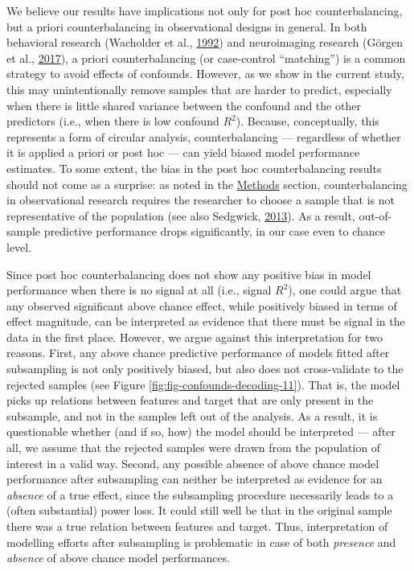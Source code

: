 \documentclass[11pt,american,a4paper,oneside,]{memoir} %
\begin{document}
We believe our results have implications not only for post hoc counterbalancing, but a priori counterbalancing in observational designs in general. In both behavioral research (Wacholder et al., \protect\hyperlink{ref-Wacholder1992-wb}{1992}) and neuroimaging research (Görgen et al., \protect\hyperlink{ref-Gorgen2017-sy}{2017}), a priori counterbalancing (or case-control ``matching'') is a common strategy to avoid effects of confounds. However, as we show in the current study, this may unintentionally remove samples that are harder to predict, especially when there is little shared variance between the confound and the other predictors (i.e., when there is low confound \(R^2\)). Because, conceptually, this represents a form of circular analysis, counterbalancing --- regardless of whether it is applied a priori or post hoc --- can yield biased model performance estimates. To some extent, the bias in the post hoc counterbalancing results should not come as a surprise: as noted in the \protect\hyperlink{confounds-decoding-methods}{Methods} section, counterbalancing in observational research requires the researcher to choose a sample that is not representative of the population (see also Sedgwick, \protect\hyperlink{ref-Sedgwick2013-op}{2013}). As a result, out-of-sample predictive performance drops significantly, in our case even to chance level.

Since post hoc counterbalancing does not show any positive bias in model performance when there is no signal at all (i.e., signal \(R^2\)), one could argue that any observed significant above chance effect, while positively biased in terms of effect magnitude, can be interpreted as evidence that there must be signal in the data in the first place. However, we argue against this interpretation for two reasons. First, any above chance predictive performance of models fitted after subsampling is not only positively biased, but also does not cross-validate to the rejected samples (see Figure \ref{fig:fig-confounds-decoding-11}). That is, the model picks up relations between features and target that are only present in the subsample, and not in the samples left out of the analysis. As a result, it is questionable whether (and if so, how) the model should be interpreted --- after all, we assume that the rejected samples were drawn from the population of interest in a valid way. Second, any possible absence of above chance model performance after subsampling can neither be interpreted as evidence for an \emph{absence} of a true effect, since the subsampling procedure necessarily leads to a (often substantial) power loss. It could still well be that in the original sample there was a true relation between features and target. Thus, interpretation of modelling efforts after subsampling is problematic in case of both \emph{presence} and \emph{absence} of above chance model performances.
\end{document}
